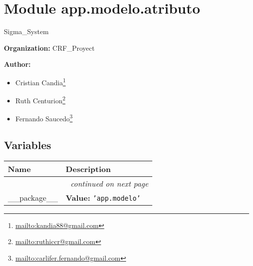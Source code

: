%
%
%


\section{Module app.modelo.atributo}

    \label{app:modelo:atributo}
Sigma\_System

\textbf{Organization:} CRF\_Proyect



\textbf{Author:} \begin{itemize}
\setlength{\parskip}{0.6ex}
  \item Cristian 
    Candia\footnote{\href{mailto:kandia88@gmail.com}{mailto:kandia88@gmail.com}}

  \item Ruth 
    Centurion\footnote{\href{mailto:ruthiccr@gmail.com}{mailto:ruthiccr@gmail.com}}

  \item Fernando 
    Saucedo\footnote{\href{mailto:carlifer.fernando@gmail.com}{mailto:carlifer.fernando@gmail.com}}

\end{itemize}





  \subsection{Variables}

    \vspace{-1cm}
\hspace{\varindent}\begin{longtable}{|p{\varnamewidth}|p{\vardescrwidth}|l}
\cline{1-2}
\cline{1-2} \centering \textbf{Name} & \centering \textbf{Description}& \\
\cline{1-2}
\endhead\cline{1-2}\multicolumn{3}{r}{\small\textit{continued on next page}}\\\endfoot\cline{1-2}
\endlastfoot\raggedright \_\-\_\-p\-a\-c\-k\-a\-g\-e\-\_\-\_\- & \raggedright \textbf{Value:} 
{\tt \texttt{'}\texttt{app.modelo}\texttt{'}}&\\
\cline{1-2}
\end{longtable}


